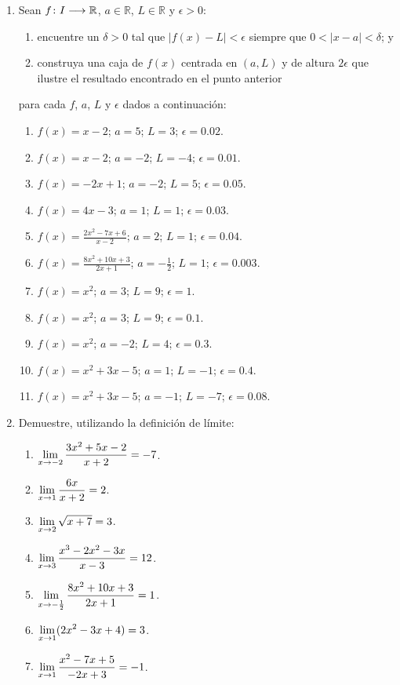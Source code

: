 \begin{multicols}{2}
\begin{enumerate}[leftmargin=*]
\item Sean $\funcjc{f}{I}{\mathbb{R}}$, $a\in\mathbb{R}$, $L\in\mathbb{R}$ y $\epsilon > 0$:
\begin{enumerate}[leftmargin=*]
\item encuentre un $\delta > 0$ tal que $|f(x) - L| < \epsilon$ siempre que $0 < |x - a| <
    \delta$; y
\item construya una caja de $f(x)$ centrada en $(a,L)$ y de altura $2\epsilon$ que ilustre
    el resultado encontrado en el punto anterior
\end{enumerate}
para cada $f$, $a$, $L$ y $\epsilon$ dados a continuación:
\begin{enumerate}[leftmargin=*]
\item $f(x) = x - 2$; $a = 5$; $L = 3$; $\epsilon = 0.02$.
\item $f(x) = x - 2$; $a = -2$; $L = -4$; $\epsilon = 0.01$.
\item $f(x) = -2x + 1$; $a = -2$; $L = 5$; $\epsilon = 0.05$.
\item $f(x) = 4x - 3$; $a = 1$; $L = 1$; $\epsilon = 0.03$.
\item $f(x) = \frac{2x^2 - 7x + 6}{x - 2}$; $a = 2$; $L = 1$; $\epsilon = 0.04$.
\item $f(x) = \frac{8x^2 + 10x + 3}{2x + 1}$; $a = -\frac{1}{2}$; $L = 1$; $\epsilon = 0.003$.
\item $f(x) = x^2$; $a = 3$; $L = 9$; $\epsilon = 1$.
\item $f(x) = x^2$; $a = 3$; $L = 9$; $\epsilon = 0.1$.
\item $f(x) = x^2$; $a = -2$; $L = 4$; $\epsilon = 0.3$.
\item $f(x) = x^2 + 3x - 5$; $a = 1$; $L = -1$; $\epsilon = 0.4$.
\item $f(x) = x^2 + 3x - 5$; $a = -1$; $L = -7$; $\epsilon = 0.08$.
\end{enumerate}

\item Demuestre, utilizando la definición de límite:
   \begin{enumerate}[leftmargin=*]
   \item $\displaystyle\limjc{\frac{3x^2 + 5x - 2}{x + 2}}{x}{-2} = -7$.
   \item $\displaystyle\limjc{\frac{6x}{x + 2}}{x}{1} = 2$.
   \item $\displaystyle\limjc{\sqrt{x + 7}}{x}{2} = 3$.
   \item $\displaystyle\limjc{\frac{x^3 - 2x^2 - 3x}{x - 3}}{x}{3} = 12$.
   \item $\displaystyle\limjc{\frac{8x^2 + 10x + 3}{2x + 1}}{x}{-\frac{1}{2}} = 1$.
   \item $\displaystyle\limjc{(2x^2 - 3x + 4)}{x}{1} = 3$.
   \item $\displaystyle\limjc{\frac{x^2 - 7x + 5}{-2x + 3}}{x}{1} = -1$.
   \end{enumerate}
\end{enumerate}
\end{multicols}
\endgroup

